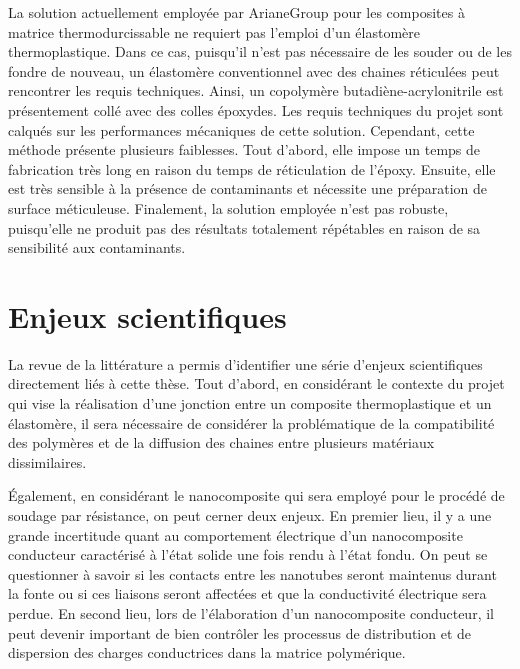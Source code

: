 La solution actuellement employée par ArianeGroup pour les composites à matrice thermodurcissable ne requiert pas l'emploi d'un élastomère thermoplastique. 
Dans ce cas, puisqu'il n'est pas nécessaire de les souder ou de les fondre de nouveau, un élastomère conventionnel avec des chaines réticulées peut rencontrer les requis techniques. 
Ainsi, un copolymère butadiène-acrylonitrile est présentement collé avec des colles époxydes. 
Les requis techniques du projet sont calqués sur les performances mécaniques de cette solution. 
Cependant, cette méthode présente plusieurs faiblesses. 
Tout d'abord, elle impose un temps de fabrication très long en raison du temps de réticulation de l'époxy. 
Ensuite, elle est très sensible à la présence de contaminants et nécessite une préparation de surface méticuleuse. 
Finalement, la solution employée n'est pas robuste, puisqu'elle ne produit pas des résultats totalement répétables en raison de sa sensibilité aux contaminants. 

\section{Enjeux scientifiques}

La revue de la littérature a permis d'identifier une série d'enjeux scientifiques directement liés à cette thèse. 
Tout d'abord, en considérant le contexte du projet qui vise la réalisation d'une jonction entre un composite thermoplastique et un élastomère, il sera nécessaire de considérer la problématique de la compatibilité des polymères et de la diffusion des chaines entre plusieurs matériaux dissimilaires. 

Également, en considérant le nanocomposite qui sera employé pour le procédé de soudage par résistance, on peut cerner deux enjeux. 
En premier lieu, il y a une grande incertitude quant au comportement électrique d'un nanocomposite conducteur caractérisé à l'état solide une fois rendu à l'état fondu. 
On peut se questionner à savoir si les contacts entre les nanotubes seront maintenus durant la fonte ou si ces liaisons seront affectées et que la conductivité électrique sera perdue. 
En second lieu, lors de l'élaboration d'un nanocomposite conducteur, il peut devenir important de bien contrôler les processus de distribution et de dispersion des charges conductrices dans la matrice polymérique. 
